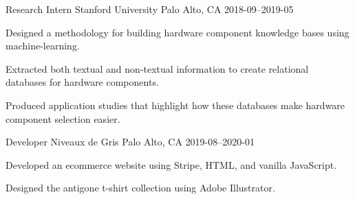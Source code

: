 \begin{cventries}
  \cventry
    {Research Intern} %
    {Stanford University} %
    {Palo Alto, CA} %
    {2018-09–2019-05} %
    {
      \begin{cvitems} %
        \item {Designed a methodology for building hardware component knowledge bases using machine-learning.}
        \item {Extracted both textual and non-textual information to create relational databases for hardware components.}
        \item {Produced application studies that highlight how these databases make hardware component selection easier.}
      \end{cvitems}
    }

  \cventry
    {Developer} %
    {Niveaux de Gris} %
    {Palo Alto, CA} %
    {2019-08–2020-01} %
    {
      \begin{cvitems} %
        \item {Developed an ecommerce website using Stripe, HTML, and vanilla JavaScript.}
        \item {Designed the antigone t-shirt collection using Adobe Illustrator.}
      \end{cvitems}
    }

\end{cventries}
